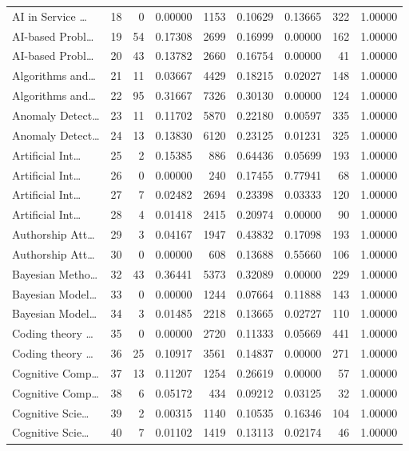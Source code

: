 \begin{table}
\begin{tabular}{lrrrrrrrr}
AI in Service … & 18 & 0 & 0.00000 & 1153 & 0.10629 & 0.13665 & 322 & 1.00000 \\
AI-based Probl… & 19 & 54 & 0.17308 & 2699 & 0.16999 & 0.00000 & 162 & 1.00000 \\
AI-based Probl… & 20 & 43 & 0.13782 & 2660 & 0.16754 & 0.00000 & 41 & 1.00000 \\
Algorithms and… & 21 & 11 & 0.03667 & 4429 & 0.18215 & 0.02027 & 148 & 1.00000 \\
Algorithms and… & 22 & 95 & 0.31667 & 7326 & 0.30130 & 0.00000 & 124 & 1.00000 \\
Anomaly Detect… & 23 & 11 & 0.11702 & 5870 & 0.22180 & 0.00597 & 335 & 1.00000 \\
Anomaly Detect… & 24 & 13 & 0.13830 & 6120 & 0.23125 & 0.01231 & 325 & 1.00000 \\
Artificial Int… & 25 & 2 & 0.15385 & 886 & 0.64436 & 0.05699 & 193 & 1.00000 \\
Artificial Int… & 26 & 0 & 0.00000 & 240 & 0.17455 & 0.77941 & 68 & 1.00000 \\
Artificial Int… & 27 & 7 & 0.02482 & 2694 & 0.23398 & 0.03333 & 120 & 1.00000 \\
Artificial Int… & 28 & 4 & 0.01418 & 2415 & 0.20974 & 0.00000 & 90 & 1.00000 \\
Authorship Att… & 29 & 3 & 0.04167 & 1947 & 0.43832 & 0.17098 & 193 & 1.00000 \\
Authorship Att… & 30 & 0 & 0.00000 & 608 & 0.13688 & 0.55660 & 106 & 1.00000 \\
Bayesian Metho… & 32 & 43 & 0.36441 & 5373 & 0.32089 & 0.00000 & 229 & 1.00000 \\
Bayesian Model… & 33 & 0 & 0.00000 & 1244 & 0.07664 & 0.11888 & 143 & 1.00000 \\
Bayesian Model… & 34 & 3 & 0.01485 & 2218 & 0.13665 & 0.02727 & 110 & 1.00000 \\
Coding theory … & 35 & 0 & 0.00000 & 2720 & 0.11333 & 0.05669 & 441 & 1.00000 \\
Coding theory … & 36 & 25 & 0.10917 & 3561 & 0.14837 & 0.00000 & 271 & 1.00000 \\
Cognitive Comp… & 37 & 13 & 0.11207 & 1254 & 0.26619 & 0.00000 & 57 & 1.00000 \\
Cognitive Comp… & 38 & 6 & 0.05172 & 434 & 0.09212 & 0.03125 & 32 & 1.00000 \\
Cognitive Scie… & 39 & 2 & 0.00315 & 1140 & 0.10535 & 0.16346 & 104 & 1.00000 \\
Cognitive Scie… & 40 & 7 & 0.01102 & 1419 & 0.13113 & 0.02174 & 46 & 1.00000 \\

\end{tabular}
\end{table}
